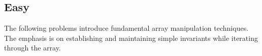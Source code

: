 \subsection{Easy}

The following problems introduce fundamental array manipulation techniques.
The emphasis is on establishing and maintaining simple invariants while
iterating through the array.






% 
% 
